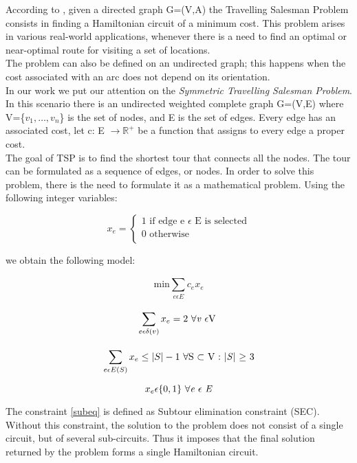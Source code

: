 According to  \cite{fischetti2019introduction}, given a directed graph G=(V,A) the Travelling Salesman Problem consists in finding a Hamiltonian circuit of a minimum cost. This problem arises in various real-world applications, whenever there is a need to find an optimal or near-optimal route for visiting a set of locations.\\
The problem can also be defined on an undirected graph; this happens when the cost associated with an arc does not depend on its orientation.\\ 
In our work we put our attention on the \textit{Symmetric Travelling Salesman Problem}. In this scenario there is an undirected weighted complete graph G=(V,E) where V=\{$v_1,\dotsc,v_n$\} is the set of nodes, and E is the set of edges. Every edge has an associated cost, let c: E $\rightarrow \mathbb{R}^+$ be a function that assigns to every edge a proper cost.\\
The goal of TSP is to find the shortest tour that connects all the nodes. The tour can be formulated as a sequence of edges, or nodes. In order to solve this problem, there is the need to formulate it as a mathematical problem.
Using the following integer variables:



\begin{equation*}
    x_e=
        \begin{cases}
            \text{1 if edge e $\epsilon$ E is selected}\\
        0 \text{ otherwise}\\
          \end{cases}
\end{equation*}

we obtain the following model:

\begin{equation}
    \text{min}\sum_{e \epsilon E}^{}c_ex_e
\end{equation}

\begin{equation}
    \sum_{e \epsilon \delta (v)}^{}x_e=2 \text{ $\forall$\textit{v} $\epsilon$V } 
\end{equation}

\begin{equation} \label{subeq}
    \sum_{e\epsilon E(S)}^{}x_e \leq |S|-1 \text{ $\forall$S $\subset$ V : |\textit{S}| $\geq$ 3}
\end{equation}

\begin{equation}
    x_e \epsilon \{0,1\} \text{ $\forall$\textit{e} $\epsilon$ \textit{E}}
\end{equation}


The constraint \ref{subeq} is defined as Subtour elimination constraint (SEC). Without this constraint, the solution to the problem does not consist of a single circuit, but of several sub-circuits. Thus it imposes that the final solution returned by the problem forms a single Hamiltonian circuit.
